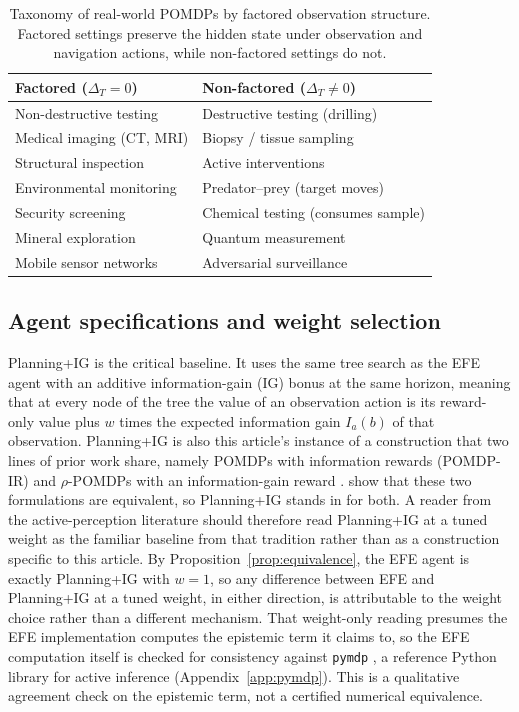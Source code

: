 \begin{table}[ht]
\centering
\caption{Taxonomy of real-world POMDPs by factored observation structure. Factored settings preserve the hidden state under observation and navigation actions, while non-factored settings do not.}
\label{tab:taxonomy}
\begin{tablebody}
\begin{tabular}{p{3.6cm}p{4.2cm}}
\toprule
\textbf{Factored} ($\Delta_T{=}0$) & \textbf{Non-factored} ($\Delta_T{\neq}0$) \\
\midrule
Non-destructive testing & Destructive testing (drilling) \\
Medical imaging (CT, MRI) & Biopsy / tissue sampling \\
Structural inspection & Active interventions \\
Environmental monitoring & Predator--prey (target moves) \\
Security screening & Chemical testing (consumes sample) \\
Mineral exploration & Quantum measurement \\
Mobile sensor networks & Adversarial surveillance \\
\bottomrule
\end{tabular}
\end{tablebody}
\end{table}

\subsection{Agent specifications and weight selection}
\label{app:theory_agents}

Planning+IG is the critical baseline. It uses the same tree search as the EFE agent with an additive information-gain (IG) bonus at the same horizon, meaning that at every node of the tree the value of an observation action is its reward-only value plus $w$ times the expected information gain $I_a(b)$ of that observation. Planning+IG is also this article's instance of a construction that two lines of prior work share, namely POMDPs with information rewards (POMDP-IR) and $\rho$-POMDPs with an information-gain reward \citep{spaan2015,araya2010}. \citet{satsangi2018} show that these two formulations are equivalent, so Planning+IG stands in for both. A reader from the active-perception literature should therefore read Planning+IG at a tuned weight as the familiar baseline from that tradition rather than as a construction specific to this article. By Proposition~\ref{prop:equivalence}, the EFE agent is exactly Planning+IG with $w{=}1$, so any difference between EFE and Planning+IG at a tuned weight, in either direction, is attributable to the weight choice rather than a different mechanism. That weight-only reading presumes the EFE implementation computes the epistemic term it claims to, so the EFE computation itself is checked for consistency against \texttt{pymdp} \citep{heins2022}, a reference Python library for active inference (Appendix~\ref{app:pymdp}). This is a qualitative agreement check on the epistemic term, not a certified numerical equivalence.

